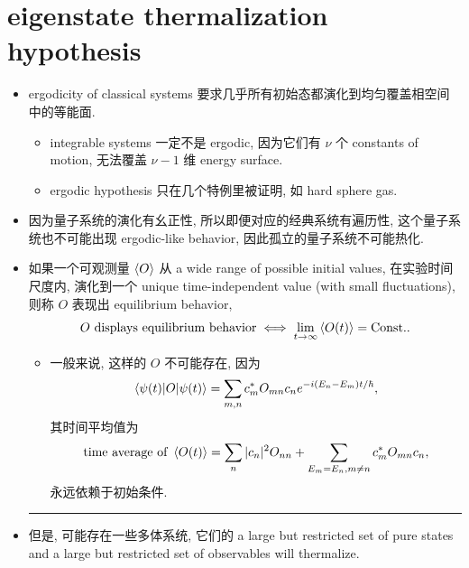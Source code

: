 \section{eigenstate thermalization hypothesis}
\begin{itemize}
	\item ergodicity of classical systems 要求几乎所有初始态都演化到均匀覆盖相空间中的等能面.
	\begin{itemize}
		\item integrable systems 一定不是 ergodic, 因为它们有 $\nu$ 个 constants of motion, 无法覆盖 $\nu - 1$ 维 energy surface.
		
		\item ergodic hypothesis 只在几个特例里被证明, 如 hard sphere gas.
	\end{itemize}
	
	\item 因为量子系统的演化有幺正性, 所以即便对应的经典系统有遍历性, 这个量子系统也不可能出现 ergodic-like behavior, 因此孤立的量子系统不可能热化.
	
	\noindent\hdashrule[0.5ex]{\linewidth}{0.5pt}{1mm} %
	
	\item 如果一个可观测量 $\braket{O}$ 从 a wide range of possible initial values, 在实验时间尺度内, 演化到一个 unique time-independent value (with small fluctuations), 则称 $O$ 表现出 equilibrium behavior,
	\begin{equation}
		O \ \text{displays equilibrium behavior} \iff \lim_{t \rightarrow \infty} \braket{O(t)} = \text{Const.}.
	\end{equation}
	\begin{itemize}
		\item 一般来说, 这样的 $O$ 不可能存在, 因为
		\begin{equation}
			\braket{\psi(t) | O | \psi(t)} = \sum_{m, n} c_m^* O_{m n} c_n e^{- i (E_n - E_m) t / \hbar},
		\end{equation}
		其时间平均值为
		\begin{equation}
			\text{time average of} \ \braket{O(t)} = \sum_n |c_n|^2 O_{n n} + \sum_{E_m = E_n, m \neq n} c_m^* O_{m n} c_n,
		\end{equation}
		永远依赖于初始条件.
	\end{itemize}
	
	\noindent\rule[0.5ex]{\linewidth}{0.5pt} %
	
	\item 但是, 可能存在一些多体系统, 它们的  a large but restricted set of pure states and a large but restricted set of observables will thermalize.
	

\end{itemize}
